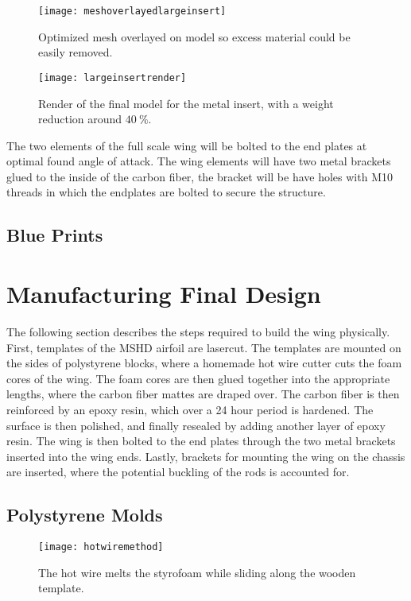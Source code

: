   \begin{figure}
    \texttt{[image: meshoverlayedlargeinsert]}
    \caption{Optimized mesh overlayed on model so excess material could be easily removed.}
    \label{fig:meshoverlay}
  \end{figure}

  \begin{figure}
    \texttt{[image: largeinsertrender]}
    \caption{Render of the final model for the metal insert, with a weight reduction around $\SI{40}{\%}$.}
    \label{fig:render_large_insert}
  \end{figure}

  The two elements of the full scale wing will be bolted to the end plates at optimal found angle of attack. The wing elements will have two metal brackets glued to the inside of the carbon fiber, the bracket will be have holes with M10 threads in which the endplates are bolted to secure the structure.

  \subsection{Blue Prints}

\section{Manufacturing Final Design}

  The following section describes the steps required to build the wing physically. First, templates of the MSHD airfoil are lasercut. The templates are mounted on the sides of polystyrene blocks, where a homemade hot wire cutter cuts the foam cores of the wing. The foam cores are then glued together into the appropriate lengths, where the carbon fiber mattes are draped over. The carbon fiber is then reinforced by an epoxy resin, which over a 24 hour period is hardened. The surface is then polished, and finally resealed by adding another layer of epoxy resin. The wing is then bolted to the end plates through the two metal brackets inserted into the wing ends. Lastly, brackets for mounting the wing on the chassis are inserted, where the potential buckling of the rods is accounted for.

  \subsection{Polystyrene Molds}

  \begin{figure}
    \texttt{[image: hotwiremethod]}
    \caption{The hot wire melts the styrofoam while sliding along the wooden template.}
    \label{fig:hotwire}
  \end{figure}

